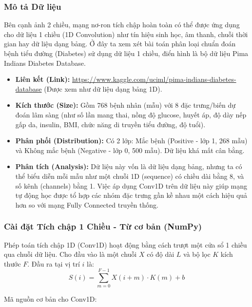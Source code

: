 \subsubsection{Mô tả Dữ liệu}
Bên cạnh ảnh 2 chiều, mạng nơ-ron tích chập hoàn toàn có thể được ứng dụng cho dữ liệu 1 chiều (1D Convolution) như tín hiệu sinh học, âm thanh, chuỗi thời gian hay dữ liệu dạng bảng. Ở đây ta xem xét bài toán phân loại chuẩn đoán bệnh tiểu đường (Diabetes) sử dụng dữ liệu 1 chiều, điển hình là bộ dữ liệu Pima Indians Diabetes Database.
\begin{itemize}
    \item \textbf{Liên kết (Link):} \url{https://www.kaggle.com/uciml/pima-indians-diabetes-database} (Được xem như dữ liệu dạng bảng 1D).
    \item \textbf{Kích thước (Size):} Gồm 768 bệnh nhân (mẫu) với 8 đặc trưng/biến dự đoán lâm sàng (như số lần mang thai, nồng độ glucose, huyết áp, độ dày nếp gấp da, insulin, BMI, chức năng di truyền tiểu đường, độ tuổi).
    \item \textbf{Phân phối (Distribution):} Có 2 lớp: Mắc bệnh (Positive - lớp 1, 268 mẫu) và Không mắc bệnh (Negative - lớp 0, 500 mẫu). Dữ liệu khá mất cân bằng.
    \item \textbf{Phân tích (Analysis):} Dữ liệu này vốn là dữ liệu dạng bảng, nhưng ta có thể biểu diễn mỗi mẫu như một chuỗi 1D (sequence) có chiều dài bằng 8, và số kênh (channels) bằng 1. Việc áp dụng Conv1D trên dữ liệu này giúp mạng tự động học được tổ hợp các nhóm đặc trưng gần kề nhau một cách hiệu quả hơn so với mạng Fully Connected truyền thống.
\end{itemize}

\subsubsection{Cài đặt Tích chập 1 Chiều - Từ cơ bản (NumPy)}

Phép toán tích chập 1D (Conv1D) hoạt động bằng cách trượt một cửa sổ 1 chiều qua chuỗi dữ liệu. Cho đầu vào là một chuỗi $X$ có độ dài $L$ và bộ lọc $K$ kích thước $F$.
Đầu ra tại vị trí $i$ là:
\begin{equation}
    S(i) = \sum_{m=0}^{F-1} X(i + m) \cdot K(m) + b
\end{equation}

Mã nguồn cơ bản cho Conv1D:

